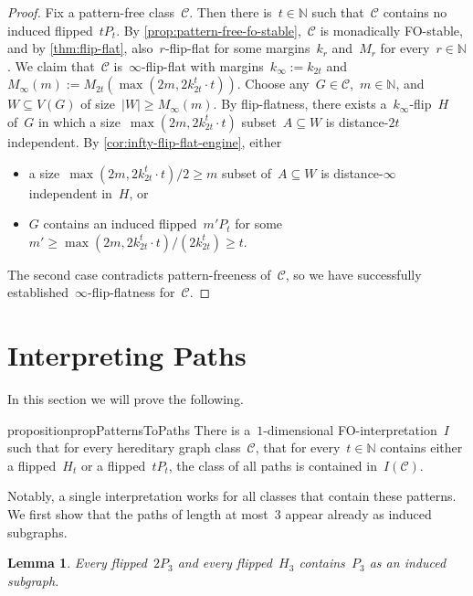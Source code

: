 \documentclass[11pt]{article}      \usepackage[margin=1in]{geometry}  \usepackage{microtype}
\newtheorem{lemma}[theorem]{Lemma}
\theoremstyle{definition}
\newcommand{\N}[0]{\mathrm{\mathbb{N}}}
\newcommand{\CC}{\mathcal{C}}
\renewcommand{\ge}{\geqslant}
\renewcommand{\geq}{\ge}
\begin{document}
\propFlipFlat*

\begin{proof}
  Fix a pattern-free class~$\CC$.
  Then there is~$t\in \N$ such that~$\CC$ contains no induced flipped~$tP_t$.
  By \cref{prop:pattern-free-fo-stable},~$\CC$ is monadically FO-stable, and by \cref{thm:flip-flat}, also~$r$-flip-flat 
  for some margins~$k_r$ and~$M_r$ for every~$r\in\N$.
  We claim that~$\CC$ is~$\infty$-flip-flat with margins~$k_\infty := k_{2t}$ and~$M_\infty(m) := M_{2t}(\max(2m,2k_{2t}^t \cdot t))$.
  Choose any~$G\in \CC$,~$m\in \N$, and~$W \subseteq V(G)$ of size~$|W| \geq M_\infty(m)$.
  By flip-flatness, there exists a~$k_\infty$-flip~$H$ of~$G$ in which a size~$\max(2m,2k_{2t}^t \cdot t)$ subset~$A \subseteq W$ is distance-$2t$ independent.
  By \cref{cor:infty-flip-flat-engine}, either
  \begin{itemize}
    \item a size~$\max(2m,2k_{2t}^t \cdot t)/2 \geq m$ subset of~$A \subseteq W$ is distance-$\infty$ independent in~$H$, or
    \item $G$ contains an induced flipped~$m'P_t$ for some~$m' \geq \max(2m,2k_{2t}^t \cdot t) / (2k^t_{2t}) \geq t$.
  \end{itemize}
  The second case contradicts pattern-freeness of~$\CC$, so we have successfully established~$\infty$-flip-flatness for~$\CC$.
\end{proof} 
\section{Interpreting Paths}\label{sec:interpreting}

In this section we will prove the following.
\begin{restatable}{proposition}{propPatternsToPaths}
\label{prop:patternsToPaths}
    There is a~$1$-dimensional FO-interpretation~$I$ such that for every hereditary graph class~$\CC$, that for every~$t\in\N$ contains either a flipped~$H_t$ or a flipped~$tP_t$,
    the class of all paths is contained in~$I(\CC)$.
\end{restatable}

Notably, a single interpretation works for all classes that contain these patterns.
We first show that the paths of length at most~$3$ appear already as induced subgraphs.

\begin{lemma}\label{lem:p3-from-swimlane}
    Every flipped~$2P_{3}$ and every flipped~$H_3$ contains~$P_3$ as an induced subgraph.
\end{lemma}
\end{document}
